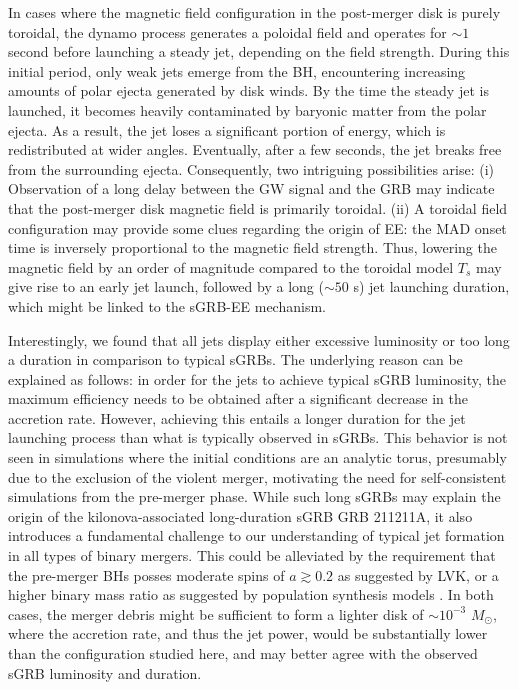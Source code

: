 \documentclass[twocolumn,dvipsnames]{aastex62}
\newcommand{\msun}{\,{M_{\odot}}}
\begin{document}
In cases where the magnetic field configuration in the post-merger disk is purely toroidal, the dynamo process generates a poloidal field and operates for $ \sim 1 $ second before launching a steady jet, depending on the field strength. During this initial period, only weak jets emerge from the BH, encountering increasing amounts of polar ejecta generated by disk winds. By the time the steady jet is launched, it becomes heavily contaminated by baryonic matter from the polar ejecta. As a result, the jet loses a significant portion of energy, which is redistributed at wider angles. Eventually, after a few seconds, the jet breaks free from the surrounding ejecta. Consequently, two intriguing possibilities arise: (i) Observation of a long delay between the GW signal and the GRB may indicate that the post-merger disk magnetic field is primarily toroidal. (ii) A toroidal field configuration may provide some clues regarding the origin of EE: the MAD onset time is inversely proportional to the magnetic field strength. Thus, lowering the magnetic field by an order of magnitude compared to the toroidal model $ T_s $ may give rise to an early jet launch, followed by a long ($ \sim 50 $ s) jet launching duration, which might be linked to the sGRB-EE mechanism.

Interestingly, we found that all jets display either excessive luminosity or too long a duration in comparison to typical sGRBs. The underlying reason can be explained as follows: in order for the jets to achieve typical sGRB luminosity, the maximum efficiency needs to be obtained after a significant decrease in the accretion rate. However, achieving this entails a longer duration for the jet launching process than what is typically observed in sGRBs. This behavior is not seen in simulations where the initial conditions are an analytic torus, presumably due to the exclusion of the violent merger, motivating the need for self-consistent simulations from the pre-merger phase. While such long sGRBs may explain the origin of the kilonova-associated long-duration sGRB GRB 211211A, it also introduces a fundamental challenge to our understanding of typical jet formation in all types of binary mergers. This could be alleviated by the requirement that the pre-merger BHs posses moderate spins of $ a \gtrsim 0.2 $ as suggested by LVK, or a higher binary mass ratio as suggested by population synthesis models \citep{Belczynski2008}. In both cases, the merger debris might be sufficient to form a lighter disk of $ \sim 10^{-3}\,\msun $, where the accretion rate, and thus the jet power, would be substantially lower than the configuration studied here, and may better agree with the observed sGRB luminosity and duration.
\end{document}
